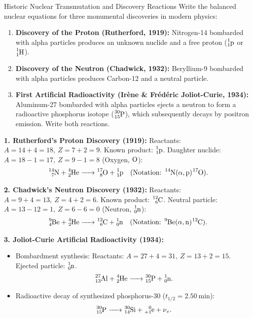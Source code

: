 \begin{exercise}{Historic Nuclear Transmutation and Discovery Reactions}
Write the balanced nuclear equations for three monumental discoveries in modern physics:
\begin{enumerate}[leftmargin=1.5em,itemsep=2pt]
  \item \textbf{Discovery of the Proton (Rutherford, 1919):} Nitrogen-14 bombarded with alpha particles produces an unknown nuclide and a free proton ($\ce{^{1}_{1}p}$ or $\ce{^{1}_{1}H}$).
  \item \textbf{Discovery of the Neutron (Chadwick, 1932):} Beryllium-9 bombarded with alpha particles produces Carbon-12 and a neutral particle.
  \item \textbf{First Artificial Radioactivity (Irène \& Frédéric Joliot-Curie, 1934):} Aluminum-27 bombarded with alpha particles ejects a neutron to form a radioactive phosphorus isotope ($\ce{^{30}_{15}P}$), which subsequently decays by positron emission. Write both reactions.
\end{enumerate}
\end{exercise}

\begin{tabletworkspace}[5.0cm]
\end{tabletworkspace}

\begin{solution}
\textbf{1. Rutherford's Proton Discovery (1919):}
Reactants: $A = 14 + 4 = 18,\ Z = 7 + 2 = 9$.
Known product: $\ce{^{1}_{1}p}$.
Daughter nuclide: $A = 18 - 1 = 17,\ Z = 9 - 1 = 8$ (Oxygen, $\ce{O}$):
\[
\ce{^{14}_{7}N + ^{4}_{2}He -> ^{17}_{8}O + ^{1}_{1}p} \quad (\text{Notation: } \ce{^{14}N(\alpha, p)^{17}O}).
\]

\textbf{2. Chadwick's Neutron Discovery (1932):}
Reactants: $A = 9 + 4 = 13,\ Z = 4 + 2 = 6$.
Known product: $\ce{^{12}_{6}C}$.
Neutral particle: $A = 13 - 12 = 1,\ Z = 6 - 6 = 0$ (Neutron, $\ce{^{1}_{0}n}$):
\[
\ce{^{9}_{4}Be + ^{4}_{2}He -> ^{12}_{6}C + ^{1}_{0}n} \quad (\text{Notation: } \ce{^{9}Be(\alpha, n)^{12}C}).
\]

\textbf{3. Joliot-Curie Artificial Radioactivity (1934):}
\begin{itemize}[leftmargin=1.5em,itemsep=2pt]
  \item Bombardment synthesis:
  Reactants: $A = 27 + 4 = 31,\ Z = 13 + 2 = 15$. Ejected particle: $\ce{^{1}_{0}n}$.
  \[
  \ce{^{27}_{13}Al + ^{4}_{2}He -> ^{30}_{15}P + ^{1}_{0}n}.
  \]
  \item Radioactive decay of synthesized phosphorus-30 ($t_{1/2} = 2.50\ \mathrm{min}$):
  \[
  \ce{^{30}_{15}P -> ^{30}_{14}Si + ^{0}_{+1}e + \nu_e}.
  \]
\end{itemize}
\end{solution}

